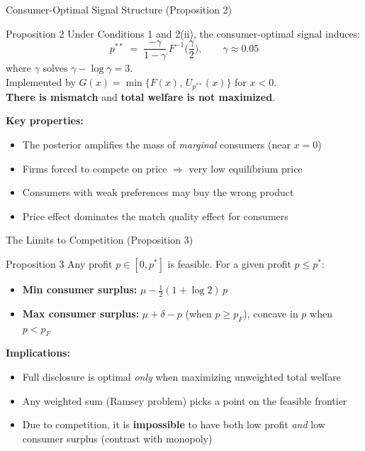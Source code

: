 \documentclass[aspectratio=169, 11pt]{beamer}
\begin{document}
\begin{frame}{Consumer-Optimal Signal Structure (Proposition 2)}

\begin{block}{Proposition 2}
Under Conditions 1 and 2(ii), the consumer-optimal signal induces:
$$p^{**} \;=\; \frac{-\gamma}{1 - \gamma}\, F^{-1}\!\Big(\frac{\gamma}{2}\Big), \qquad \gamma \approx 0.05$$
where $\gamma$ solves $\gamma - \log \gamma = 3$. \\[4pt]
Implemented by $G(x) = \min\{F(x),\, U_{p^{**}}(x)\}$ for $x < 0$. \\[4pt]
\textbf{There is mismatch} and \textbf{total welfare is not maximized}.
\end{block}

\bigskip

\textbf{Key properties:}
\begin{itemize}
    \item The posterior amplifies the mass of \emph{marginal} consumers (near $x = 0$)
    \item Firms forced to compete on price $\Rightarrow$ very low equilibrium price
    \item Consumers with weak preferences may buy the wrong product
    \item Price effect dominates the match quality effect for consumers
\end{itemize}

\end{frame}


\begin{frame}{The Limits to Competition (Proposition 3)}

\begin{block}{Proposition 3}
Any profit $p \in [0, p^*]$ is feasible. For a given profit $p \leq p^*$:
\begin{itemize}
    \item \textbf{Min consumer surplus:} $\mu - \tfrac{1}{2}(1 + \log 2)\, p$
    \item \textbf{Max consumer surplus:} $\mu + \delta - p$ \; (when $p \geq p_F$), concave in $p$ when $p < p_F$
\end{itemize}
\end{block}

\bigskip

\textbf{Implications:}
\begin{itemize}
    \item Full disclosure is optimal \emph{only} when maximizing unweighted total welfare
    \item Any weighted sum (Ramsey problem) picks a point on the feasible frontier
    \item Due to competition, it is \textbf{impossible} to have both low profit \emph{and} low consumer surplus (contrast with monopoly)
\end{itemize}

\end{frame}
\end{document}
